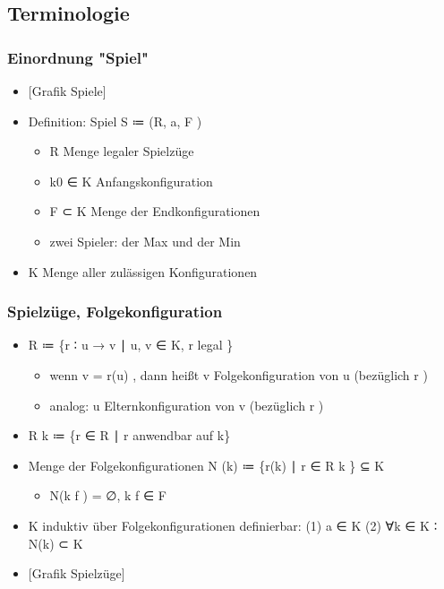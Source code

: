 \documentclass[]{article}
\begin{document}
\hypertarget{header-n64}{%
\subsection{Terminologie}\label{header-n64}}

\hypertarget{header-n73}{%
\subsubsection{Einordnung "Spiel"}\label{header-n73}}

\begin{itemize}
\item
  {[}Grafik Spiele{]}
\item
  Definition: Spiel S ≔ (R, a, F )

  \begin{itemize}
  \item
    R Menge legaler Spielzüge
  \item
    k0 ∈ K Anfangskonfiguration
  \item
    F ⊂ K Menge der Endkonfigurationen
  \item
    zwei Spieler: der Max und der Min
  \end{itemize}
\item
  K Menge aller zulässigen Konfigurationen
\end{itemize}

\hypertarget{header-n203}{%
\subsubsection{Spielzüge, Folgekonfiguration}\label{header-n203}}

\begin{itemize}
\item
  R ≔ \{r ∶ u → v ∣ u, v ∈ K, r legal \}

  \begin{itemize}
  \item
    wenn v = r(u) , dann heißt v Folgekonfiguration von u (bezüglich r )
  \item
    analog: u Elternkonfiguration von v (bezüglich r )
  \end{itemize}
\item
  R k ≔ \{r ∈ R ∣ r anwendbar auf k\}
\item
  Menge der Folgekonfigurationen N (k) ≔ \{r(k) ∣ r ∈ R k \} ⊆ K

  \begin{itemize}
  \item
    N(k f ) = ∅, k f ∈ F
  \end{itemize}
\item
  K induktiv über Folgekonfigurationen definierbar: (1) a ∈ K (2) ∀k ∈ K
  ∶ N(k) ⊂ K
\item
  {[}Grafik Spielzüge{]}
\end{itemize}
\end{document}
